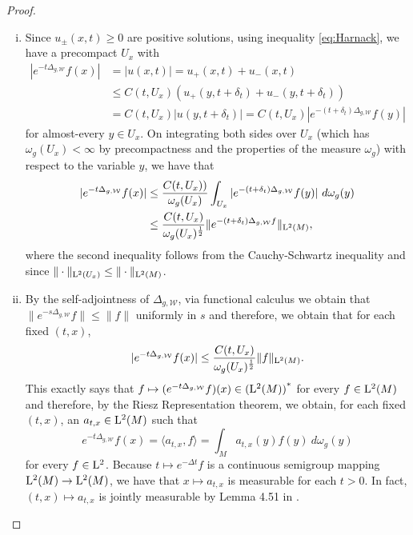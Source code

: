 \documentclass[AMS,STIX1COL]{WileyNJD-v2}
\numberwithin{equation}{section}
\renewcommand{\~}{\tilde}
\renewcommand{\-}{\bar}
\newcommand{\8}{\infty}
\newcommand{\cW}{\mathcal{W}}
\newcommand{\modulus}[1]{|#1|}
\newcommand{\norm}[1]{\| #1 \|}			%
\newcommand{\adj}[1]{{#1}^\ast}			%
\newcommand{\inprod}[1]{\langle #1 \rangle}	%
\newcommand{\Lp}[2][{}]{{\rm L}^{#2}_{\rm #1}}		%
\begin{document}
\begin{proof}
\begin{enumerate}[(i)]
\item  Since $u_{\pm}(x,t) \geq 0$ are positive solutions,
	using inequality \eqref{eq:Harnack}, we have a precompact $U_x$ 
	with 
	\begin{align*} 
	\modulus{e^{-t \Delta_{g,\cW}}f(x)}  &= \modulus{u(x,t)} = u_+(x,t) + u_-(x,t) \\
		&\leq C(t,U_x) (u_+(y,t+\delta_t) + u_-(y,t+\delta_t)) \\
		&= C(t,U_x) \modulus{u(y,t + \delta_t)}
		= C(t,U_x)  \modulus{e^{-(t + \delta_t) \Delta_{g,\cW}}f(y)}
	\end{align*} 
	for almost-every $y \in U_x$.
	On integrating both sides over $U_x$ (which has $\omega_g(U_x) < \infty$
	by precompactness and the properties of the measure $\omega_g$) with respect
	to the variable $y$,
	we have that
	\begin{align*} 
	\modulus{e^{-t \Delta_{g,\cW}}f(x)} 
		&\leq \frac{C(t,U_x))}{\omega_g(U_x)} \int_{U_x} \modulus{e^{-(t + \delta_t) \Delta_{g,\cW}}f(y)}\ d\omega_g(y) \\
		&\leq \frac{C(t,U_x)}{\omega_g(U_x)^{\frac{1}{2}}} \norm{e^{-(t + \delta_t) \Delta_{g,\cW}f}}_{\Lp{2}(M)},
	\end{align*}
	where the second inequality follows from the Cauchy-Schwartz
	inequality and since $\norm{\cdot}_{\Lp{2}(U_x)} \leq \norm{\cdot}_{\Lp{2}(M)}$.

\item By the self-adjointness of $\Delta_{g,\cW}$, via functional calculus 
	we obtain that $\norm{e^{-s\Delta_{g,\cW}}f} \leq \norm{f}$
	uniformly in $s$  and therefore, we obtain that for each fixed \((t, x)\),
	$$\modulus{e^{-t \Delta_{g,\cW}}f(x)} \leq 
		\frac{C(t,U_x)}{\omega_g(U_x)^{\frac{1}{2}}} \norm{f}_{\Lp{2}(M)}.$$
	This exactly says that $f \mapsto (e^{-t\Delta_{g,\cW}}f)(x) \in \adj{(\Lp{2}(M))}$
	for every $f \in \Lp{2}(M)$ and therefore, by the Riesz Representation theorem,
	we obtain, for each fixed \((t, x)\), an $a_{t,x} \in \Lp{2}(M)$ such that
	$$ e^{-t \Delta_{g,\cW}}f(x) = \inprod{a_{t,x},f} = \int_{M} a_{t,x}(y)f(y)\ d\omega_g(y)$$
        for every \(f \in \Lp{2}\). Because \(t \mapsto e^{-\Delta t} f\) is a continuous semigroup mapping 
	\(\Lp{2}(M) \to \Lp{2}(M)\), we have that \(x \mapsto a_{t,x}\) is measurable for each $t > 0$.
	In fact, \((t, x) \mapsto a_{t,x}\) is jointly measurable by Lemma 4.51 in \cite{AB}.


\end{enumerate}
\end{proof}
\end{document}
